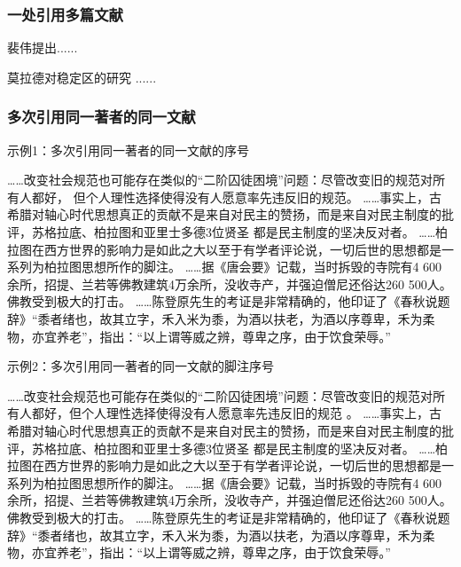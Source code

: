 \documentclass{article}
\begin{document}
\subsubsection{一处引用多篇文献}
\begin{refsection}

裴伟提出\cite{Humphrey1971--,CRANE1972--}......

莫拉德对稳定区的研究
\cite{CRANE1972--,Weinstein1974-745-772,KENNEDY1975-311-386}......


\end{refsection}


\newpage
\subsubsection{多次引用同一著者的同一文献}
\begin{refsection}
示例1：多次引用同一著者的同一文献的序号

……改变社会规范也可能存在类似的“二阶囚徒困境”问题：尽管改变旧的规范对所有人都好，
但个人理性选择使得没有人愿意率先违反旧的规范\cite{Sunstein1996-903-903}。
……事实上，古希腊对轴心时代思想真正的贡献不是来自对民主的赞扬，而是来自对民主制度的批评，苏格拉底、柏拉图和亚里士多德3位贤圣
都是民主制度的坚决反对者。
……柏拉图在西方世界的影响力是如此之大以至于有学者评论说，一切后世的思想都是一系列为柏拉图思想所作的脚注\cite{罗杰斯2011-15-16}。
……据《唐会要》记载，当时拆毁的寺院有4 600余所，招提、兰若等佛教建筑4万余所，没收寺产，并强迫僧尼还俗达260 500人。
佛教受到极大的打击。
……陈登原先生的考证是非常精确的，他印证了《春秋说题辞》“黍者绪也，故其立字，禾入米为黍，为酒以扶老，为酒以序尊卑，禾为柔物，亦宜养老”，指出：“以上谓等威之辨，尊卑之序，由于饮食荣辱。”\cite{陈登原2000-29-29}

\printbibliography[heading=subbibliography,title={参考文献}]
\end{refsection}

\begin{refsection}
示例2：多次引用同一著者的同一文献的脚注序号

……改变社会规范也可能存在类似的“二阶囚徒困境”问题：尽管改变旧的规范对所有人都好，但个人理性选择使得没有人愿意率先违反旧的规范
。
……事实上，古希腊对轴心时代思想真正的贡献不是来自对民主的赞扬，而是来自对民主制度的批评，苏格拉底、柏拉图和亚里士多德3位贤圣
都是民主制度的坚决反对者。
……柏拉图在西方世界的影响力是如此之大以至于有学者评论说，一切后世的思想都是一系列为柏拉图思想所作的脚注。
……据《唐会要》记载，当时拆毁的寺院有4 600余所，招提、兰若等佛教建筑4万余所，没收寺产，并强迫僧尼还俗达260 500人。
佛教受到极大的打击。
……陈登原先生的考证是非常精确的，他印证了《春秋说题辞》“黍者绪也，故其立字，禾入米为黍，为酒以扶老，为酒以序尊卑，禾为柔物，亦宜养老”，指出：“以上谓等威之辨，尊卑之序，由于饮食荣辱。”
\end{refsection}
\end{document}
